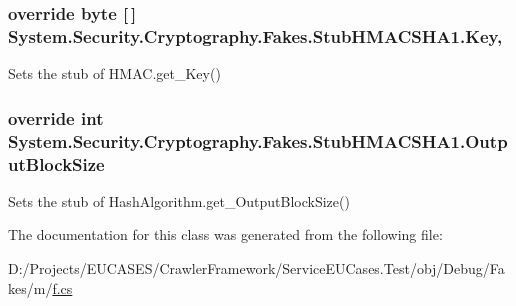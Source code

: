 \hypertarget{class_system_1_1_security_1_1_cryptography_1_1_fakes_1_1_stub_h_m_a_c_s_h_a1_a4faac96367a6f03b98414b6445af664c}{
\subsubsection[{Key}]{\setlength{\rightskip}{0pt plus 5cm}override byte \mbox{[}$\,$\mbox{]} System.\-Security.\-Cryptography.\-Fakes.\-Stub\-H\-M\-A\-C\-S\-H\-A1.\-Key\hspace{0.3cm}{\ttfamily [get]}, {\ttfamily [set]}}}\label{class_system_1_1_security_1_1_cryptography_1_1_fakes_1_1_stub_h_m_a_c_s_h_a1_a4faac96367a6f03b98414b6445af664c}


Sets the stub of H\-M\-A\-C.\-get\-\_\-\-Key()

\hypertarget{class_system_1_1_security_1_1_cryptography_1_1_fakes_1_1_stub_h_m_a_c_s_h_a1_a42606312f6009fb961739885d89b4a56}{
\subsubsection[{Output\-Block\-Size}]{\setlength{\rightskip}{0pt plus 5cm}override int System.\-Security.\-Cryptography.\-Fakes.\-Stub\-H\-M\-A\-C\-S\-H\-A1.\-Output\-Block\-Size\hspace{0.3cm}{\ttfamily [get]}}}\label{class_system_1_1_security_1_1_cryptography_1_1_fakes_1_1_stub_h_m_a_c_s_h_a1_a42606312f6009fb961739885d89b4a56}


Sets the stub of Hash\-Algorithm.\-get\-\_\-\-Output\-Block\-Size()



The documentation for this class was generated from the following file\-:\begin{DoxyCompactItemize}
\item 
D\-:/\-Projects/\-E\-U\-C\-A\-S\-E\-S/\-Crawler\-Framework/\-Service\-E\-U\-Cases.\-Test/obj/\-Debug/\-Fakes/m/\hyperlink{m_2f_8cs}{f.\-cs}\end{DoxyCompactItemize}
